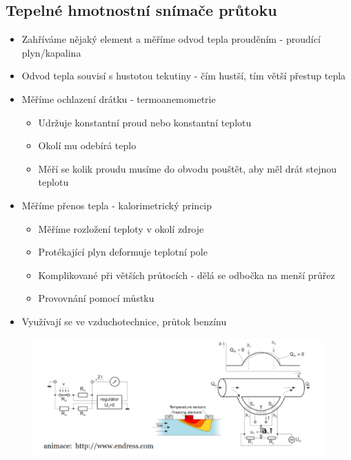 \subsection*{Tepelné hmotnostní snímače průtoku}
\begin{itemize}
    \item Zahříváme nějaký element a měříme odvod tepla prouděním - proudící plyn/kapalina
    \item Odvod tepla souvisí s hustotou tekutiny - čím hustší, tím větší přestup tepla
    \item Měříme ochlazení drátku - termoanemometrie \begin{itemize}
              \item Udržuje konstantní proud nebo konstantní teplotu
              \item Okolí mu odebírá teplo
              \item Měří se kolik proudu musíme do obvodu pouštět, aby měl drát stejnou teplotu
          \end{itemize}
    \item Měříme přenos tepla - kalorimetrický princip \begin{itemize}
              \item Měříme rozložení teploty v okolí zdroje
              \item Protékající plyn deformuje teplotní pole
              \item Komplikované při větších průtocích - dělá se odbočka na menší průřez
              \item Provovnání pomocí můstku
          \end{itemize}
    \item Využívají se ve vzduchotechnice, průtok benzínu
\end{itemize}

\begin{figure}[h]
    \centering
    \includegraphics[scale = 1]{img/kalorime.png}
\end{figure}

